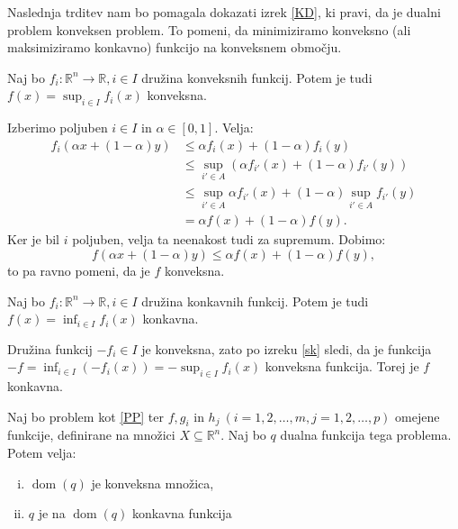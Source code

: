 \documentclass[mat1]{fmfdelo}
\newcommand{\R}{\mathbb R}
\DeclareMathOperator{\dom}{dom}
\begin{document}
Naslednja trditev nam bo pomagala dokazati izrek \ref{KD}, ki pravi, da je dualni problem konveksen problem. To pomeni, da minimiziramo konveksno (ali maksimiziramo konkavno) funkcijo na konveksnem območju. 

\begin{trditev} \label{sk}
	Naj bo $f_i: \R^n \to \R, i \in I$ družina konveksnih funkcij. Potem je tudi $f(x) = \sup_{i \in I}f_i(x)$ konveksna. 
\end{trditev}

\begin{dokaz}
	Izberimo poljuben $i\in I$ in $\alpha \in [0,1].$ Velja:
	\begin{align*}
	f_i(\alpha  x + (1-\alpha ) y) &\le \alpha  f_i(x)  + (1-\alpha ) f_i(y) \\
	& \le  \sup_{i' \in A} (\alpha  f_{i'}(x)  + (1-\alpha ) f_{i'}(y)) \\
	& \le  \sup_{i' \in A} \alpha  f_{i'}(x)  + (1-\alpha ) \sup_{i' \in A}f_{i'}(y) \\
	&= \alpha  f(x) + (1-\alpha ) f(y).
	\end{align*}
	Ker je bil $i$ poljuben, velja ta neenakost tudi za supremum. Dobimo:
	$$ f(\alpha  x + (1-\alpha ) y) \le \alpha  f(x) + (1-\alpha ) f(y),$$
	to pa ravno pomeni, da je $f$ konveksna. 
\end{dokaz}

\begin{posledica}
	\label{psk}
	Naj bo $f_i: \R^n \to \R, i \in I$ družina konkavnih funkcij. Potem je tudi $f(x) = \inf_{i \in I}f_i(x)$ konkavna. 
\end{posledica}

\begin{dokaz}
	Družina funkcij $-f_i\in I$ je konveksna, zato po izreku \ref{sk} sledi, da je funkcija $-f = \inf_{i \in I}(-f_i(x)) =  -\sup_{i \in I}f_i(x)$ konveksna funkcija. Torej je $f$ konkavna.
\end{dokaz}

\begin{izrek}\label{KD}
	Naj bo problem kot \eqref{PP} ter $f, g_i$ in $h_j~ (i = 1,2,\ldots,m, j=1,2,\ldots,p)$ omejene funkcije, definirane na množici $X \subseteq \R^n$. Naj bo $q$ dualna funkcija tega problema. Potem velja:
	\begin{enumerate}[(i)]
		\item 
		$\dom(q)$ je konveksna množica, 
		\item 
		$q$ je na $\dom(q)$ konkavna funkcija 
	\end{enumerate}
\end{izrek}
\end{document}
